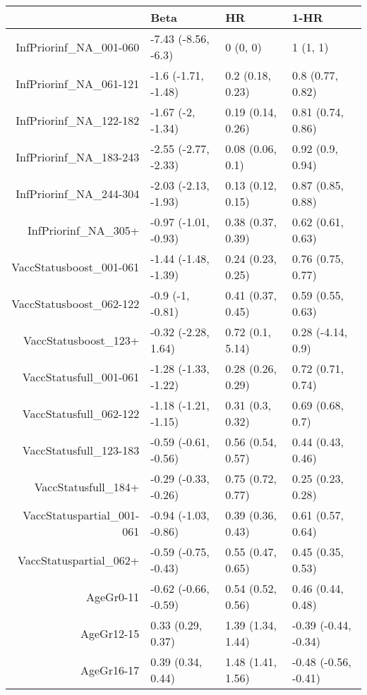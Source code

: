 \begin{table}[ht]
\centering
\begin{tabular}{rlll}
  \hline
 & Beta & HR & 1-HR \\ 
  \hline
InfPriorinf\_NA\_001-060 & -7.43 (-8.56, -6.3) & 0 (0, 0) & 1 (1, 1) \\ 
  InfPriorinf\_NA\_061-121 & -1.6 (-1.71, -1.48) & 0.2 (0.18, 0.23) & 0.8 (0.77, 0.82) \\ 
  InfPriorinf\_NA\_122-182 & -1.67 (-2, -1.34) & 0.19 (0.14, 0.26) & 0.81 (0.74, 0.86) \\ 
  InfPriorinf\_NA\_183-243 & -2.55 (-2.77, -2.33) & 0.08 (0.06, 0.1) & 0.92 (0.9, 0.94) \\ 
  InfPriorinf\_NA\_244-304 & -2.03 (-2.13, -1.93) & 0.13 (0.12, 0.15) & 0.87 (0.85, 0.88) \\ 
  InfPriorinf\_NA\_305+ & -0.97 (-1.01, -0.93) & 0.38 (0.37, 0.39) & 0.62 (0.61, 0.63) \\ 
  VaccStatusboost\_001-061 & -1.44 (-1.48, -1.39) & 0.24 (0.23, 0.25) & 0.76 (0.75, 0.77) \\ 
  VaccStatusboost\_062-122 & -0.9 (-1, -0.81) & 0.41 (0.37, 0.45) & 0.59 (0.55, 0.63) \\ 
  VaccStatusboost\_123+ & -0.32 (-2.28, 1.64) & 0.72 (0.1, 5.14) & 0.28 (-4.14, 0.9) \\ 
  VaccStatusfull\_001-061 & -1.28 (-1.33, -1.22) & 0.28 (0.26, 0.29) & 0.72 (0.71, 0.74) \\ 
  VaccStatusfull\_062-122 & -1.18 (-1.21, -1.15) & 0.31 (0.3, 0.32) & 0.69 (0.68, 0.7) \\ 
  VaccStatusfull\_123-183 & -0.59 (-0.61, -0.56) & 0.56 (0.54, 0.57) & 0.44 (0.43, 0.46) \\ 
  VaccStatusfull\_184+ & -0.29 (-0.33, -0.26) & 0.75 (0.72, 0.77) & 0.25 (0.23, 0.28) \\ 
  VaccStatuspartial\_001-061 & -0.94 (-1.03, -0.86) & 0.39 (0.36, 0.43) & 0.61 (0.57, 0.64) \\ 
  VaccStatuspartial\_062+ & -0.59 (-0.75, -0.43) & 0.55 (0.47, 0.65) & 0.45 (0.35, 0.53) \\ 
  AgeGr0-11 & -0.62 (-0.66, -0.59) & 0.54 (0.52, 0.56) & 0.46 (0.44, 0.48) \\ 
  AgeGr12-15 & 0.33 (0.29, 0.37) & 1.39 (1.34, 1.44) & -0.39 (-0.44, -0.34) \\ 
  AgeGr16-17 & 0.39 (0.34, 0.44) & 1.48 (1.41, 1.56) & -0.48 (-0.56, -0.41) \\ 

\end{tabular}
\end{table}
